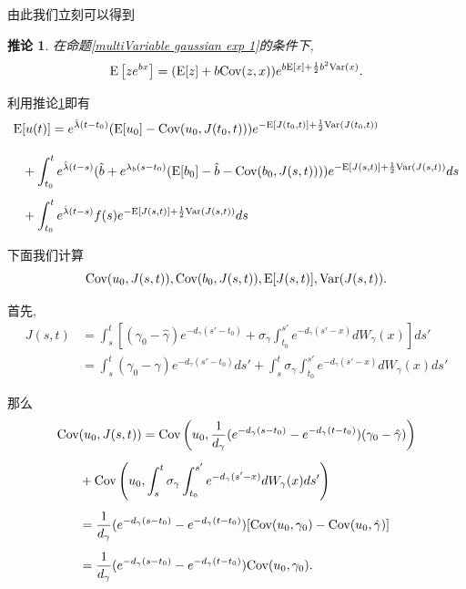 \documentclass[notitlepage,cs4size,punct,oneside]{ctexrep}
\numberwithin{equation}{section}
\theoremstyle{mystyle}
\newtheorem{corollary}[definition]{\hspace{2em}推论}
\begin{document}
由此我们立刻可以得到
\begin{corollary} \label{multiVariable gaussian exp 2} 在命题\ref{multiVariable gaussian exp 1}的条件下,
$$\text{E}\left[ze^{bx}\right] = (\text{E}[z]+b\text{Cov}(z, x))e^{b\text{E}[x]+\frac{1}{2}b^2\text{Var}(x)}.$$
\end{corollary}

利用推论\ref{multiVariable gaussian exp 2}即有
\begin{equation} \label{E u(t)}
\begin{split}
\text{E}&[u(t)] = e^{\hat{\lambda}(t-t_0)}(\text{E}[u_0]-\text{Cov}(u_0, J(t_0, t)))e^{-\text{E}[J(t_0, t)]+\frac{1}{2}\text{Var}(J(t_0, t))} \\[10pt]
&+ \int_{t_0}^t e^{\hat{\lambda}(t-s)}(\hat{b}+e^{\lambda_b(s-t_0)}(\text{E}[b_0]-\hat{b}-\text{Cov}(b_0, J(s, t))))e^{-\text{E}[J(s, t)]+\frac{1}{2}\text{Var}(J(s, t))}ds \\[5pt]
&+ \int_{t_0}^t e^{\hat{\lambda}(t-s)}f(s)e^{-\text{E}[J(s, t)]+\frac{1}{2}\text{Var}(J(s, t))}ds
\end{split}
\end{equation}

下面我们计算
$$\text{Cov}(u_0, J(s, t)), \text{Cov}(b_0, J(s, t)), \text{E}[J(s, t)], \text{Var}(J(s, t)).$$

首先,
\begin{equation} \label{J(s, t) all}
\begin{split}
J(s, t) &= \int_s^t \left[(\gamma_0-\hat{\gamma})e^{-d_\gamma(s'-t_0)}+\sigma_\gamma\int_{t_0}^{s'}e^{-d_\gamma(s'-x)}dW_\gamma(x)\right]ds' \\[5pt]
& = \int_s^t(\gamma_0-\hat{\gamma})e^{-d_\gamma(s'-t_0)}ds' +\int_s^t \sigma_\gamma\int_{t_0}^{s'} e^{-d_\gamma(s'-x)}dW_\gamma(x)ds'
\end{split}
\end{equation}

那么
\begin{equation} \label{Cov u0 J(s, t)}
\begin{split}
\text{Cov}&(u_0, J(s, t)) = \text{Cov}\left(u_0, \frac{1}{d_\gamma}(e^{-d_\gamma(s-t_0)}-e^{-d_\gamma(t-t_0)})(\gamma_0 - \hat{\gamma})\right) \\[5pt]
&+ \text{Cov}\left(u_0, \int_s^t \sigma_\gamma \int_{t_0}^{s'} e^{-d_\gamma(s'-x)} dW_\gamma(x)ds'\right)\\[5pt]
&= \frac{1}{d_\gamma}(e^{-d_\gamma(s-t_0)}-e^{-d_\gamma(t-t_0)})[\text{Cov}(u_0, \gamma_0)-\text{Cov}(u_0, \hat{\gamma})] \\[5pt]
&= \frac{1}{d_\gamma}(e^{-d_\gamma(s-t_0)}-e^{-d_\gamma(t-t_0)})\text{Cov}(u_0, \gamma_0).
\end{split}
\end{equation}
\end{document}
